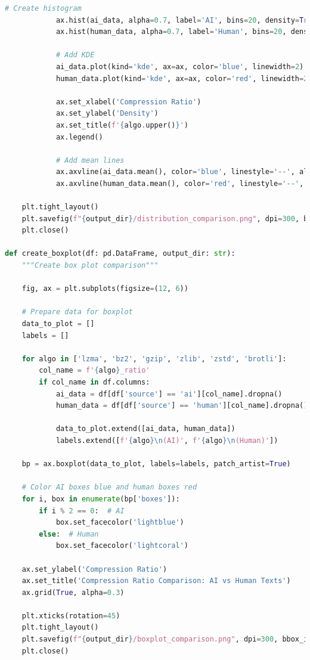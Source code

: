 \documentclass[12pt,a4paper]{report}
\begin{document}
\begin{lstlisting}[language=Python, caption=Visualization Generation]
            # Create histogram
            ax.hist(ai_data, alpha=0.7, label='AI', bins=20, density=True, color='blue')
            ax.hist(human_data, alpha=0.7, label='Human', bins=20, density=True, color='red')

            # Add KDE
            ai_data.plot(kind='kde', ax=ax, color='blue', linewidth=2)
            human_data.plot(kind='kde', ax=ax, color='red', linewidth=2)

            ax.set_xlabel('Compression Ratio')
            ax.set_ylabel('Density')
            ax.set_title(f'{algo.upper()}')
            ax.legend()

            # Add mean lines
            ax.axvline(ai_data.mean(), color='blue', linestyle='--', alpha=0.7)
            ax.axvline(human_data.mean(), color='red', linestyle='--', alpha=0.7)

    plt.tight_layout()
    plt.savefig(f"{output_dir}/distribution_comparison.png", dpi=300, bbox_inches='tight')
    plt.close()

def create_boxplot(df: pd.DataFrame, output_dir: str):
    """Create box plot comparison"""

    fig, ax = plt.subplots(figsize=(12, 6))

    # Prepare data for boxplot
    data_to_plot = []
    labels = []

    for algo in ['lzma', 'bz2', 'gzip', 'zlib', 'zstd', 'brotli']:
        col_name = f'{algo}_ratio'
        if col_name in df.columns:
            ai_data = df[df['source'] == 'ai'][col_name].dropna()
            human_data = df[df['source'] == 'human'][col_name].dropna()

            data_to_plot.extend([ai_data, human_data])
            labels.extend([f'{algo}\n(AI)', f'{algo}\n(Human)'])

    bp = ax.boxplot(data_to_plot, labels=labels, patch_artist=True)

    # Color AI boxes blue and human boxes red
    for i, box in enumerate(bp['boxes']):
        if i % 2 == 0:  # AI
            box.set_facecolor('lightblue')
        else:  # Human
            box.set_facecolor('lightcoral')

    ax.set_ylabel('Compression Ratio')
    ax.set_title('Compression Ratio Comparison: AI vs Human Texts')
    ax.grid(True, alpha=0.3)

    plt.xticks(rotation=45)
    plt.tight_layout()
    plt.savefig(f"{output_dir}/boxplot_comparison.png", dpi=300, bbox_inches='tight')
    plt.close()


\end{lstlisting}
\end{document}
